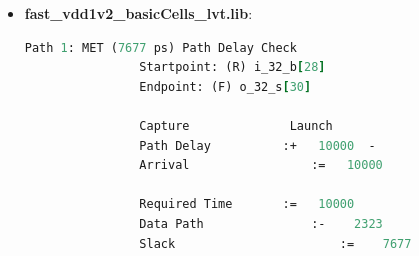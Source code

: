 \begin{enumerate}[label=\arabic*.]
\begin{itemize}
			\begin{lstlisting}[style=StyleCode, language=TCL, caption={Delay .sdf file Using slow\_vdd1v0\_basicCells\_hvt.lib (\href{https://github.com/Noname-29-lnin/Floating_point/blob/main/Version_Final2/05_synth/Genus/slow_vdd1v0_basicCells_hvt/FPU_unit.sdf}{This link}).}]
				(DELAYFILE
					(SDFVERSION  "OVI 3.0")
					(DESIGN      "FPU_unit")
					(DATE        "Sun Nov 23 23:08:44 -0500 2025")
					(VENDOR      "Cadence, Inc.")
					(PROGRAM     "Genus(TM) Synthesis Solution")
					(VERSION     "GENUS15.20 - 15.20-p004_1")
					(DIVIDER     .)
					(VOLTAGE     ::0.899999)
					(PROCESS     "::1.0")
					(TEMPERATURE ::125.0)
					(TIMESCALE   1ns)
					(CELL
					(CELLTYPE "MXI2XLHVT")
					(INSTANCE EXP_ADJUST_UNIT.CLA_8BIT_UNIT.CLA_4BIT_UNIT_0.g311)
					(DELAY
						(ABSOLUTE
							(PORT A (::0.000))
							(PORT B (::0.000))
							(PORT S0 (::0.000))
							(IOPATH A Y (::0.105) (::0.161))
							(IOPATH B Y (::0.094) (::0.147))
							(IOPATH S0 Y (::0.132) (::0.169))
							)
						)
					)
				...
				  	(CELL
					(CELLTYPE "OR2XLHVT")
					(INSTANCE g42)
						(DELAY
							(ABSOLUTE
								(PORT A (::0.000))
								(PORT B (::0.000))
								(IOPATH A Y (::0.139) (::0.215))
								(IOPATH B Y (::0.107) (::0.144))
							)
						)
					)
				)
			\end{lstlisting}
			
			\item \textbf{fast\_vdd1v2\_basicCells\_lvt.lib}:
			\begin{lstlisting}[style=StyleResult, language=TCL, caption={Timing Report Using fast\_vdd1v2\_basicCells\_lvt.lib (Worst-Case Corner).}]
				Path 1: MET (7677 ps) Path Delay Check
				Startpoint: (R) i_32_b[28]
				Endpoint: (F) o_32_s[30]
				
				Capture   			 Launch  
				Path Delay			:+   10000	-  
				Arrival					:=   10000            
				
				Required Time		:=   10000            
				Data Path				:-    2323            
				Slack						:=    7677            
			\end{lstlisting}
		

\end{itemize}
\end{enumerate}
